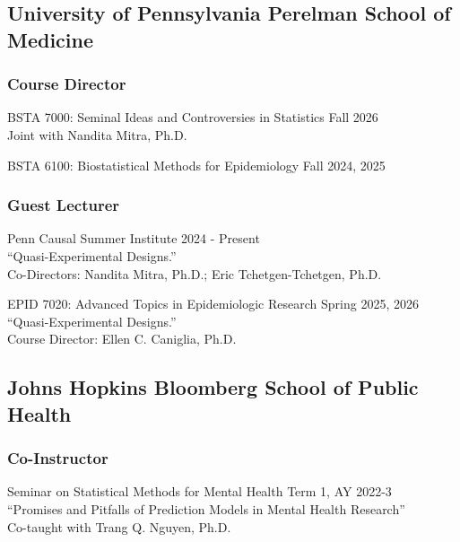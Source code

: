 \documentclass[letterpaper,11pt]{article} %
\begin{document}
	\subsection*{University of Pennsylvania Perelman School of Medicine}
	
	\subsubsection*{Course Director}
	\begin{etaremune}
        \item BSTA 7000: Seminal Ideas and Controversies in Statistics \hfill Fall 2026 \\
        Joint with Nandita Mitra, Ph.D.
		\item BSTA 6100: Biostatistical Methods for Epidemiology \hfill Fall 2024, 2025
	\end{etaremune}
	
	\subsubsection*{Guest Lecturer}
	\begin{etaremune}
		\item Penn Causal Summer Institute \hfill 2024 - Present \\
		``Quasi-Experimental Designs.'' \\
		Co-Directors: Nandita Mitra, Ph.D.; Eric Tchetgen-Tchetgen, Ph.D.
		\item EPID 7020: Advanced Topics in Epidemiologic Research \hfill Spring 2025, 2026 \\
		``Quasi-Experimental Designs.'' \\
		Course Director: Ellen C. Caniglia, Ph.D.
	\end{etaremune}
	
	\subsection*{Johns Hopkins Bloomberg School of Public Health}
	
	\subsubsection*{Co-Instructor}
	\begin{etaremune}
		\item Seminar on Statistical Methods for Mental Health \hfill Term 1, AY 2022-3 \\
		``Promises and Pitfalls of Prediction Models in Mental Health Research'' \\
		Co-taught with Trang Q. Nguyen, Ph.D.
	\end{etaremune}
	
\end{document}
